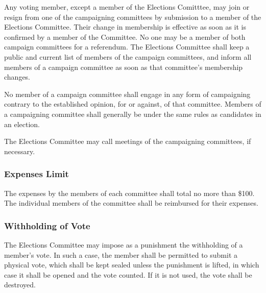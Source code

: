 Any voting member, except a member of the Elections Comitttee, may join or
resign from one of the campaigning committees by submission to a member of the
Elections Committee. Their change in membership is effective as soon as it is
confirmed by a member of the Committee. No one may be a member of both campaign
committees for a referendum. The Elections Committee shall keep a public and
current list of members of the campaign committees, and inform all members of a
campaign committee as soon as that committee's membership changes.

No member of a campaign committee shall engage in any form of campaigning
contrary to the established opinion, for or against, of that committee. Members
of a campaigning committee shall generally be under the same rules as candidates
in an election.

The Elections Committee may call meetings of the campaigning committees, if
necessary.

\subsubsection{Expenses Limit}
The expenses by the members of each committee shall total no more than \$100.
The individual members of the committee shall be reimbursed for their expenses.

\subsubsection{Withholding of Vote}
The Elections Committee may impose as a punishment the withholding of a member's
vote. In such a case, the member shall be permitted to submit a physical vote,
which shall be kept sealed unless the punishment is lifted, in which case it
shall be opened and the vote counted. If it is not used, the vote shall be
destroyed.
